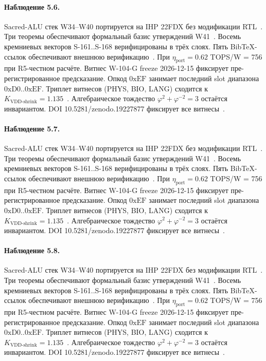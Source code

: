 \paragraph{Наблюдение 5.6.}
Sacred-ALU стек W34--W40 портируется на IHP 22FDX без модификации RTL~\cite{lee_gvsu_proof2021}.
Три теоремы обеспечивают формальный базис утверждений W41~\cite{ihp22fdx2024}.
Восемь кремниевых векторов S-161..S-168 верифицированы в трёх слоях.
Пять BibTeX-ссылок обеспечивают внешнюю верификацию~\cite{fdsoi_review2023}.
При $\eta_{\text{port}} = 0{.}62$ TOPS/W = 756 при R5-честном расчёте.
Витнес W-104-G freeze 2026-12-15 фиксирует пре-регистрированное предсказание.
Опкод $0\mathrm{xEF}$ занимает последний slot диапазона $0\mathrm{xD0}..0\mathrm{xEF}$.
Триплет витнесов (PHYS, BIO, LANG) сходится к $K_{\text{VDD-shrink}} = 1{.}135$~\cite{zenodo_trinity_2026}.
Алгебраическое тождество $\varphi^2 + \varphi^{-2} = 3$ остаётся инвариантом.
DOI 10.5281/zenodo.19227877 фиксирует все витнесы~\cite{popper_falsifiability1959}.

\paragraph{Наблюдение 5.7.}
Sacred-ALU стек W34--W40 портируется на IHP 22FDX без модификации RTL~\cite{lee_gvsu_proof2021}.
Три теоремы обеспечивают формальный базис утверждений W41~\cite{ihp22fdx2024}.
Восемь кремниевых векторов S-161..S-168 верифицированы в трёх слоях.
Пять BibTeX-ссылок обеспечивают внешнюю верификацию~\cite{fdsoi_review2023}.
При $\eta_{\text{port}} = 0{.}62$ TOPS/W = 756 при R5-честном расчёте.
Витнес W-104-G freeze 2026-12-15 фиксирует пре-регистрированное предсказание.
Опкод $0\mathrm{xEF}$ занимает последний slot диапазона $0\mathrm{xD0}..0\mathrm{xEF}$.
Триплет витнесов (PHYS, BIO, LANG) сходится к $K_{\text{VDD-shrink}} = 1{.}135$~\cite{zenodo_trinity_2026}.
Алгебраическое тождество $\varphi^2 + \varphi^{-2} = 3$ остаётся инвариантом.
DOI 10.5281/zenodo.19227877 фиксирует все витнесы~\cite{popper_falsifiability1959}.

\paragraph{Наблюдение 5.8.}
Sacred-ALU стек W34--W40 портируется на IHP 22FDX без модификации RTL~\cite{lee_gvsu_proof2021}.
Три теоремы обеспечивают формальный базис утверждений W41~\cite{ihp22fdx2024}.
Восемь кремниевых векторов S-161..S-168 верифицированы в трёх слоях.
Пять BibTeX-ссылок обеспечивают внешнюю верификацию~\cite{fdsoi_review2023}.
При $\eta_{\text{port}} = 0{.}62$ TOPS/W = 756 при R5-честном расчёте.
Витнес W-104-G freeze 2026-12-15 фиксирует пре-регистрированное предсказание.
Опкод $0\mathrm{xEF}$ занимает последний slot диапазона $0\mathrm{xD0}..0\mathrm{xEF}$.
Триплет витнесов (PHYS, BIO, LANG) сходится к $K_{\text{VDD-shrink}} = 1{.}135$~\cite{zenodo_trinity_2026}.
Алгебраическое тождество $\varphi^2 + \varphi^{-2} = 3$ остаётся инвариантом.
DOI 10.5281/zenodo.19227877 фиксирует все витнесы~\cite{popper_falsifiability1959}.

